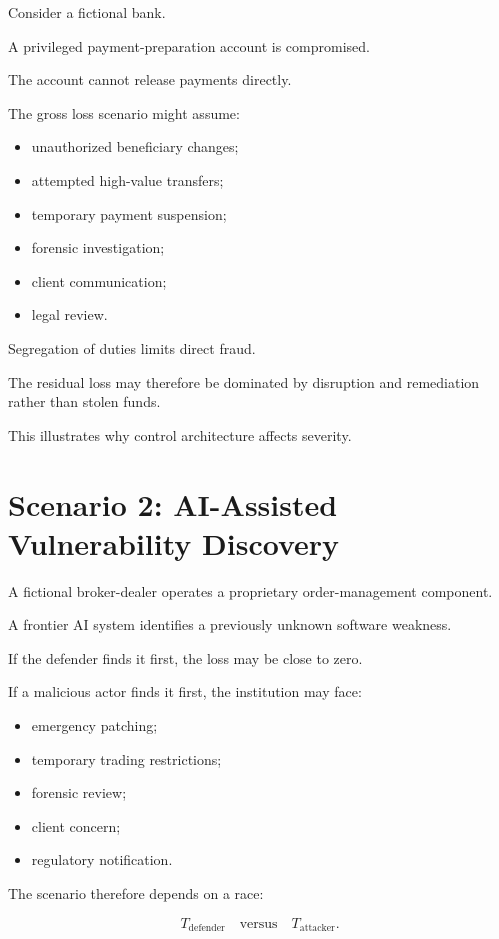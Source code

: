 Consider a fictional bank.

A privileged payment-preparation account is compromised.

The account cannot release payments directly.

The gross loss scenario might assume:

\begin{itemize}
    \item unauthorized beneficiary changes;
    \item attempted high-value transfers;
    \item temporary payment suspension;
    \item forensic investigation;
    \item client communication;
    \item legal review.
\end{itemize}

Segregation of duties limits direct fraud.

The residual loss may therefore be dominated by disruption and remediation rather than stolen funds.

This illustrates why control architecture affects severity.

\section{Scenario 2: AI-Assisted Vulnerability Discovery}

A fictional broker-dealer operates a proprietary order-management component.

A frontier AI system identifies a previously unknown software weakness.

If the defender finds it first, the loss may be close to zero.

If a malicious actor finds it first, the institution may face:

\begin{itemize}
    \item emergency patching;
    \item temporary trading restrictions;
    \item forensic review;
    \item client concern;
    \item regulatory notification.
\end{itemize}

The scenario therefore depends on a race:

\begin{equation}
T_{\text{defender}}
\quad \text{versus} \quad
T_{\text{attacker}}.
\end{equation}

